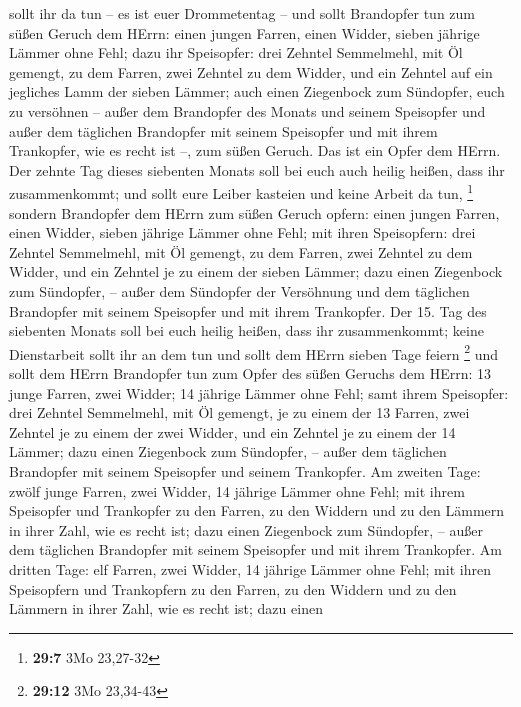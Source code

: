 sollt ihr da tun -- es ist euer Drommetentag --  und sollt
Brandopfer tun zum süßen Geruch dem HErrn: einen jungen Farren, einen
Widder, sieben jährige Lämmer ohne Fehl;  dazu ihr
Speisopfer: drei Zehntel Semmelmehl, mit Öl gemengt, zu dem Farren, zwei
Zehntel zu dem Widder,  und ein Zehntel auf ein jegliches
Lamm der sieben Lämmer;  auch einen Ziegenbock zum
Sündopfer, euch zu versöhnen --  außer dem Brandopfer des
Monats und seinem Speisopfer und außer dem täglichen Brandopfer mit
seinem Speisopfer und mit ihrem Trankopfer, wie es recht ist --, zum
süßen Geruch. Das ist ein Opfer dem HErrn.  Der zehnte Tag
dieses siebenten Monats soll bei euch auch heilig heißen, dass ihr
zusammenkommt; und sollt eure Leiber kasteien und keine Arbeit da tun,
\footnote{\textbf{29:7} 3Mo 23,27-32}  sondern Brandopfer
dem HErrn zum süßen Geruch opfern: einen jungen Farren, einen Widder,
sieben jährige Lämmer ohne Fehl;  mit ihren Speisopfern:
drei Zehntel Semmelmehl, mit Öl gemengt, zu dem Farren, zwei Zehntel zu
dem Widder,  und ein Zehntel je zu einem der sieben Lämmer;
 dazu einen Ziegenbock zum Sündopfer, -- außer dem
Sündopfer der Versöhnung und dem täglichen Brandopfer mit seinem
Speisopfer und mit ihrem Trankopfer.  Der 15. Tag des
siebenten Monats soll bei euch heilig heißen, dass ihr zusammenkommt;
keine Dienstarbeit sollt ihr an dem tun und sollt dem HErrn sieben Tage
feiern \footnote{\textbf{29:12} 3Mo 23,34-43}  und sollt
dem HErrn Brandopfer tun zum Opfer des süßen Geruchs dem HErrn: 13 junge
Farren, zwei Widder; 14 jährige Lämmer ohne Fehl;  samt
ihrem Speisopfer: drei Zehntel Semmelmehl, mit Öl gemengt, je zu einem
der 13 Farren, zwei Zehntel je zu einem der zwei Widder, 
und ein Zehntel je zu einem der 14 Lämmer;  dazu einen
Ziegenbock zum Sündopfer, -- außer dem täglichen Brandopfer mit seinem
Speisopfer und seinem Trankopfer.  Am zweiten Tage: zwölf
junge Farren, zwei Widder, 14 jährige Lämmer ohne Fehl; 
mit ihrem Speisopfer und Trankopfer zu den Farren, zu den Widdern und zu
den Lämmern in ihrer Zahl, wie es recht ist;  dazu einen
Ziegenbock zum Sündopfer, -- außer dem täglichen Brandopfer mit seinem
Speisopfer und mit ihrem Trankopfer.  Am dritten Tage: elf
Farren, zwei Widder, 14 jährige Lämmer ohne Fehl;  mit
ihren Speisopfern und Trankopfern zu den Farren, zu den Widdern und zu
den Lämmern in ihrer Zahl, wie es recht ist;  dazu einen

